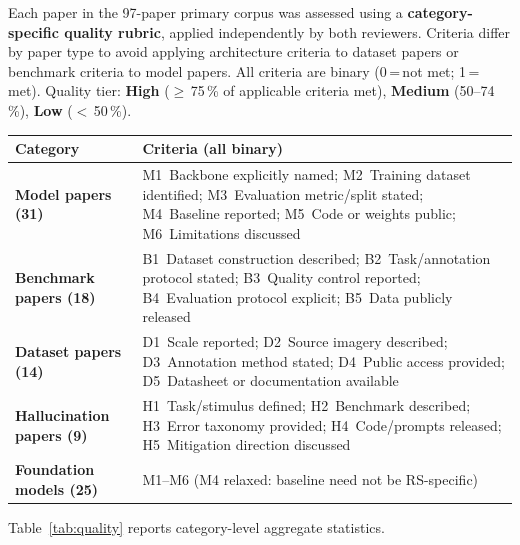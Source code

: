 Each paper in the 97-paper primary corpus was assessed using a
\textbf{category-specific quality rubric}, applied independently by both
reviewers. Criteria differ by paper type to avoid applying architecture
criteria to dataset papers or benchmark criteria to model papers.
All criteria are binary (0\,=\,not met; 1\,=\,met). Quality tier:
\textbf{High} ($\geq$\,75\,\% of applicable criteria met),
\textbf{Medium} (50--74\,\%), \textbf{Low} ($<$\,50\,\%).

\smallskip
\begin{tabular}{@{}p{3.2cm}p{8.0cm}@{}}
\toprule
\textbf{Category} & \textbf{Criteria (all binary)} \\
\midrule
\textbf{Model papers (31)}
  & M1~Backbone explicitly named; M2~Training dataset identified;
    M3~Evaluation metric/split stated; M4~Baseline reported;
    M5~Code or weights public; M6~Limitations discussed \\[3pt]
\textbf{Benchmark papers (18)}
  & B1~Dataset construction described; B2~Task/annotation protocol stated;
    B3~Quality control reported; B4~Evaluation protocol explicit;
    B5~Data publicly released \\[3pt]
\textbf{Dataset papers (14)}
  & D1~Scale reported; D2~Source imagery described;
    D3~Annotation method stated; D4~Public access provided;
    D5~Datasheet or documentation available \\[3pt]
\textbf{Hallucination papers (9)}
  & H1~Task/stimulus defined; H2~Benchmark described;
    H3~Error taxonomy provided; H4~Code/prompts released;
    H5~Mitigation direction discussed \\[3pt]
\textbf{Foundation models (25)}
  & M1--M6 (M4 relaxed: baseline need not be RS-specific) \\
\bottomrule
\end{tabular}
\smallskip

\noindent Table~\ref{tab:quality} reports category-level aggregate statistics.

